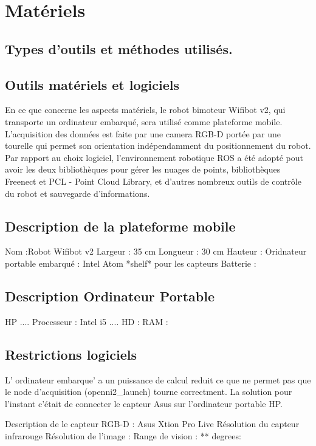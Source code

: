 \section{Matériels}

\subsection{Types d'outils et méthodes utilisés.}

\subsection{Outils matériels et logiciels}
En ce que concerne les aspects matériels, le robot bimoteur Wifibot v2, qui transporte un ordinateur embarqué, sera utilisé comme plateforme mobile. L'acquisition des données est faite par une camera RGB-D portée par une tourelle qui permet son orientation indépendamment du positionnement du robot.
Par rapport au choix logiciel, l'environnement robotique ROS a été adopté pout avoir les deux bibliothèques pour gérer les nuages de points,  bibliothèques Freenect et PCL - Point Cloud Library, et d'autres nombreux outils de contrôle du robot et sauvegarde d'informations.

\subsection{ Description de la plateforme mobile }

Nom :Robot Wifibot v2
Largeur : 35 cm
Longueur : 30 cm
Hauteur : 
Oridnateur portable embarqué : Intel Atom
*shelf* pour les capteurs
Batterie :

\subsection{Description Ordinateur Portable}

HP ....
Processeur : Intel i5 ....
HD : 
RAM :


\subsection{Restrictions logiciels}
L' ordinateur embarque' a un puissance de calcul reduit ce que ne permet pas que le node d'acquisition (openni2_launch) tourne correctment. La solution pour l'instant c'était de connecter le capteur Asus sur l'ordinateur portable HP.

Description de le capteur RGB-D :
Asus Xtion Pro Live
Résolution du capteur infrarouge
Résolution de l'image :
Range de vision : ** degrees:


